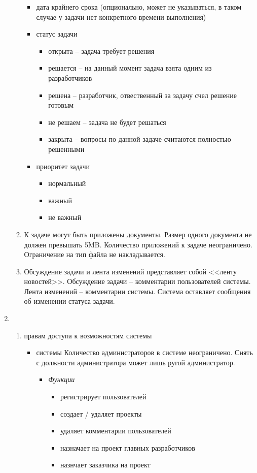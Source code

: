 \documentclass[14pt,a4paper]{extarticle}
\begin{document}
\begin{enumerate}
\begin{enumerate}
\begin{itemize}
				\item дата крайнего срока (опционально, может не указываться, в таком случае у задачи нет конкретного времени выполнения)
				
				\item статус задачи
				\begin{itemize}
					\item открыта -- задача требует решения
					\item решается -- на данный момент задача взята одним из разработчиков
					\item решена -- разработчик, отвественный за задачу счел решение готовым
					\item не решаем -- задача не будет решаться
					\item закрыта -- вопросы по данной задаче считаются полностью решенными
				\end{itemize}
				
				\item приоритет задачи
				\begin{itemize}
					\item нормальный
					\item важный
					\item не важный
				\end{itemize}
			\end{itemize}
			
			\item К задаче могут быть приложены документы. Размер одного документа не должен превышать 5MB. Количество приложений к задаче неограничено. Ограничение на тип файла не накладывается.
			
			\item Обсуждение задачи и лента изменений представляет собой <<ленту новостей>>. Обсуждение задачи -- комментарии пользователей системы. Лента изменений -- комментарии системы. Система оставляет сообщения об изменении статуса задачи.
		\end{enumerate}
		
		\item {}
		\begin{enumerate}
			\item { правам доступа к возможностям системы}
			\begin{itemize}
				\item { системы}
				Количество администраторов в системе неограничено. Снять с должности администратора может лишь ругой администратор.
				\begin{itemize}
					\item {\it Функции}
					\begin{itemize}
						\item регистрирует пользователей
						\item создает / удаляет проекты
						\item удаляет комментарии пользователей
						\item назначает на проект главных разработчиков
						\item назнчает заказчика на проект
					\end{itemize}
					

\end{itemize}
\end{itemize}
\end{enumerate}
\end{enumerate}
\end{document}

